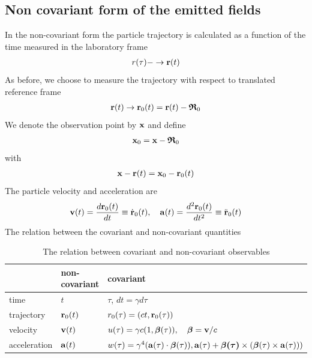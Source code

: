 \subsection{Non covariant form of the emitted fields}


In the non-covariant form the particle trajectory is calculated as a function of the time measured in the laboratory frame
\begin{align}
    r(\tau) -\rightarrow {\bf r}(t)
\end{align}
As before, we choose to measure the trajectory with respect to translated reference frame
\begin{align}
    {\bf r}(t) \rightarrow {\bf r}_0(t) = {\bf r}(t) - {\boldsymbol{\mathfrak R}}_0
\end{align}
We denote the observation point by ${\bf x}$ and define
\begin{align}
    {\bf x}_0={\bf x}-{\boldsymbol{\mathfrak R}}_0
\end{align}
with
\begin{align}
    {\bf x}-{\bf r}(t) = {\bf x}_0-{\bf r}_0(t)
\end{align}
The particle velocity and acceleration are
\begin{align}
    {\bf v}(t) =\frac{d{\bf r}_0(t)}{dt} \equiv \dot {\bf r}_0(t), \quad {\bf a}(t) = \frac{d^2{\bf r}_0(t)}{dt^2}\equiv\ddot {\bf r}_0(t)
\end{align}
The relation between the covariant and non-covariant quantities

\begin{table}[H]
    \begin{center}
        \begin{tabular}{l|l|l}
            \hline
                         & non-covariant  & covariant                                                                                                                                                          \\\hline
            time         & $t$            & $\tau$, $dt=\gamma d\tau$                                                                                                                                          \\\hline
            trajectory   & ${\bf r}_0(t)$ & $r_0(\tau) = (ct, {\bf r}_0(\tau))$                                                                                                                                \\\hline
            velocity     & ${\bf v}(t)$   & $u(\tau) = \gamma c(1,{\boldsymbol \beta}(\tau)),\quad  {\boldsymbol{\beta}  ={\bf v}/c}$                                                                          \\\hline
            acceleration & ${\bf a}(t)$   & $w(\tau) = \gamma^4({\bf a}(\tau)\cdot{\boldsymbol\beta}(\tau)), {\bf a}(\tau)+{\boldsymbol{\beta(\tau)}\times({\boldsymbol\beta}(\tau)\times {\bf a}(\tau))})$
        \end{tabular}\end{center}
    \caption{The relation between covariant and non-covariant observables}
\end{table}

